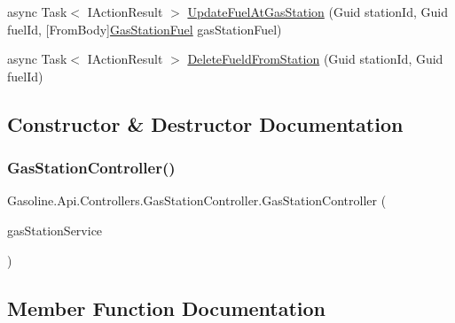 \begin{DoxyCompactItemize}
\item 
async Task$<$ I\+Action\+Result $>$ \mbox{\hyperlink{class_gasoline_1_1_api_1_1_controllers_1_1_gas_station_controller_ab519696365e4fb18d71532b2d93c9296}{Update\+Fuel\+At\+Gas\+Station}} (Guid station\+Id, Guid fuel\+Id, \mbox{[}From\+Body\mbox{]}\mbox{\hyperlink{class_gasoline_1_1_data_1_1_models_1_1_gas_station_fuel}{Gas\+Station\+Fuel}} gas\+Station\+Fuel)
\item 
async Task$<$ I\+Action\+Result $>$ \mbox{\hyperlink{class_gasoline_1_1_api_1_1_controllers_1_1_gas_station_controller_a275471cbd87f8c9132d9d7d354a6b828}{Delete\+Fueld\+From\+Station}} (Guid station\+Id, Guid fuel\+Id)
\end{DoxyCompactItemize}


\subsection{Constructor \& Destructor Documentation}
\mbox{\label{class_gasoline_1_1_api_1_1_controllers_1_1_gas_station_controller_a1995c0ed2466f4f802961b9cbada4ff9}} 
\subsubsection{\texorpdfstring{GasStationController()}{GasStationController()}}
{\footnotesize\ttfamily Gasoline.\+Api.\+Controllers.\+Gas\+Station\+Controller.\+Gas\+Station\+Controller (\begin{DoxyParamCaption}\item[{\mbox{\hyperlink{class_gasoline_1_1_data_1_1_services_1_1_gas_station_service}{Gas\+Station\+Service}}}]{gas\+Station\+Service }\end{DoxyParamCaption})}



\subsection{Member Function Documentation}
\mbox{\label{class_gasoline_1_1_api_1_1_controllers_1_1_gas_station_controller_a83af1e4ba007a75c65f4a63928e8cf97}} 

